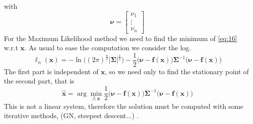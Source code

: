 \documentclass[12pt,twoside]{report}
\begin{document}
with 
\begin{equation}
    \boldsymbol{\nu}=\begin{bmatrix}
    \nu_1\\
    \vdots\\
    \nu_n
    \end{bmatrix}
\end{equation}
For the Maximum Likelihood method we need to find the minimum of \ref{eq:16} w.r.t $\mathbf{x}$. As usual to ease the computation we consider the log. 
\begin{equation}
    \ell_n(\mathbf{x})=-\ln\big((2\pi)^{\frac{n}{2}}|\boldsymbol{\Sigma}|^{\frac{1}{2}}\big)-\frac{1}{2}\big(\boldsymbol{\nu}-\mathbf{f}(\mathbf{x})\big)\boldsymbol{\Sigma}^{-1}\big(\boldsymbol{\nu}-\mathbf{f}(\mathbf{x})\big)
\end{equation}
The first part is independent of $\mathbf{x}$, so we need only to find the stationary point of the second part, that is 
\begin{equation}
\hat{\mathbf{x}}=\arg \min_{\beta,\mathbf{x}}\frac{1}{2}\big(\boldsymbol{\nu}-\mathbf{f}(\mathbf{x})\big)\boldsymbol{\Sigma}^{-1}\big(\boldsymbol{\nu}-\mathbf{f}(\mathbf{x})\big)
\end{equation}
This is not a linear system, therefore the solution must be computed with some iterative methods, (GN, steepest descent...) \cite{chong2013introduction}.

\clearpage
\end{document}
